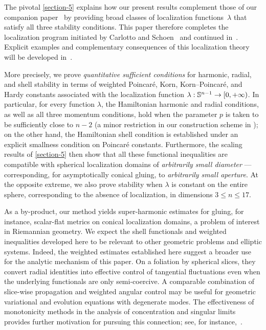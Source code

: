 \documentclass[11pt]{article}
\numberwithin{table}{section}
\numberwithin{equation}{section}
\numberwithin{table}{section}
\numberwithin{figure}{section}
\begin{document}
The pivotal \autoref{section-5} explains how our present results complement those of our companion paper~\cite{LL-optimal-main} by providing broad classes of localization functions~$\lambda$ that satisfy all three stability conditions.
This paper therefore completes the localization program initiated by Carlotto and Schoen~\cite{CarlottoSchoen} and continued in~\cite{LL-optimal-main}. Explicit examples and complementary consequences of this localization theory will be developed in~\cite{LL-next}.

More precisely, we prove \emph{quantitative sufficient conditions} for harmonic, radial, and shell stability in terms of weighted Poincar\'e, Korn, Korn--Poincar\'e, and Hardy constants associated with the localization function $\lambda:\mathbb S^{n-1}\to[0,+\infty)$. In particular, for every function $\lambda$, the Hamiltonian harmonic and radial conditions, as well as all three momentum conditions, hold when the parameter $p$ is taken to be sufficiently close to $n- 2$ (a minor restriction in our construction scheme in \cite{LL-optimal-main}); on the other hand, the Hamiltonian shell condition is established under an explicit smallness condition on Poincaré constants. Furthermore, the scaling results of \autoref{section-5} then show that all these functional inequalities are compatible with spherical localization domains of \emph{arbitrarily small diameter} ---corresponding, for asymptotically conical gluing, to \emph{arbitrarily small aperture}. At the opposite extreme, we also prove stability when $\lambda$ is constant on the entire sphere, corresponding to the absence of localization, in dimensions \(3\leq n\leq17\).

As a by-product, our method yields super-harmonic estimates for gluing, for instance, scalar-flat metrics on conical localization domains, a problem of interest in Riemannian geometry. We expect the shell functionals and weighted inequalities developed here to be relevant to other geometric problems and elliptic systems. Indeed, the weighted estimates established here suggest a broader use for the analytic mechanism of this paper.  On a foliation by spherical slices, they convert radial identities into effective control of tangential fluctuations even when the underlying functionals are only semi-coercive.  A comparable combination of slice-wise propagation and weighted angular control may be useful for geometric variational and evolution equations with degenerate modes.  The effectiveness of monotonicity methods in the analysis of concentration and singular limits provides further motivation for pursuing this connection; see, for instance,~\cite{BrendleHuisken:2017,CDHS,ColdingMinicozzi}.
\end{document}
